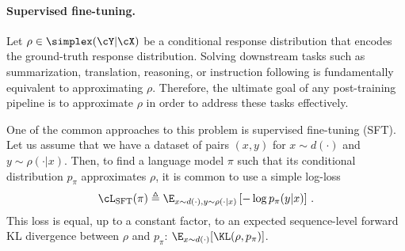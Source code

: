 
\paragraph{Supervised fine-tuning.} Let $\rho \in \simplex(\cY | \cX)$ be a conditional response distribution that encodes the ground-truth response distribution. Solving downstream tasks such as summarization, translation, reasoning, or instruction following is fundamentally equivalent to approximating $\rho$. Therefore, the ultimate goal of any post-training pipeline is to approximate $\rho$ in order to address these tasks effectively. 

One of the common approaches to this problem is supervised fine-tuning (SFT). Let us assume that we have a dataset of pairs $(x,y)$ for $x \sim d(\cdot)$ and $y \sim \rho(\cdot | x)$. Then, to find a language model $\pi$ such that its conditional distribution $p_{\pi}$ approximates $\rho$, it is common to use a simple log-loss
\begin{equation}\label{eq:sft_loss}
    \cL_{\mathrm{SFT}}(\pi) \triangleq \E_{x \sim d(\cdot), y \sim \rho(\cdot | x)}\left[ - \log p_{\pi}(y|x) \right]\,.
\end{equation}
This loss is equal, up to a constant factor, to an expected sequence-level forward KL divergence between $\rho$ and $p_{\pi}$: $\E_{x \sim d(\cdot)}[\KL(\rho, p_{\pi})]$.

